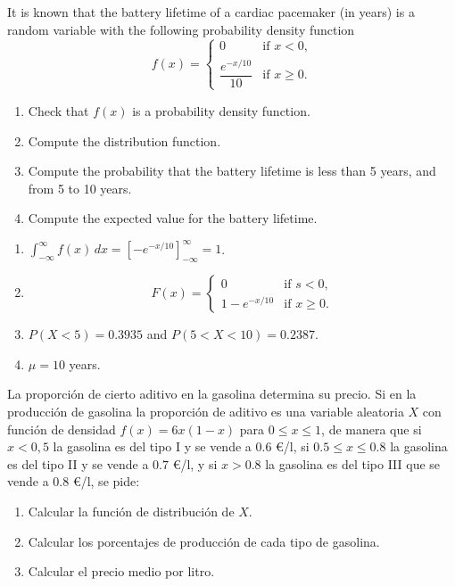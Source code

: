{It is known that the battery lifetime of a cardiac pacemaker (in years) is a random variable with the following probability density function 
\[
f(x)=
\begin{cases}
0 & \mbox{if $x<0$,}\\
\dfrac{e^{-x/10}}{10} & \mbox{if $x\geq 0$.}
\end{cases}
\]
\begin{enumerate}
\item Check that $f(x)$ is a probability density function.
\item Compute the distribution function.
\item Compute the probability that the battery lifetime is less than 5 years, and from 5 to 10 years.
\item Compute the expected value for the battery lifetime.
\end{enumerate}
}
{
\begin{enumerate}
\item $\int_{-\infty}^\infty f(x)\, dx = [-e^{-x/10}]_{-\infty}^\infty = 1$.
\item \[
F(x)=
\begin{cases}
0 & \mbox{if $s<0$,}\\
1-e^{-x/10} & \mbox{if $x\geq 0$.}
\end{cases}
\]
\item $P(X<5)=0.3935$ and $P(5<X<10)=0.2387$.
\item $\mu=10$ years.
\end{enumerate}
}
{}


{La proporción de cierto aditivo en la gasolina determina su precio. Si en la producción de gasolina la proporción de
aditivo es una variable aleatoria $X$ con función de densidad $f(x)=6x(1-x)$ para $0\leq x\leq 1$, de manera que si
$x<0,5$ la gasolina es del tipo I y se vende a $0.6$ \euro/l, si $0.5\leq x\leq 0.8$ la gasolina es del tipo II y se
vende a $0.7$ \euro/l, y si $x>0.8$ la gasolina es del tipo III que se vende a $0.8$ \euro/l, se pide:
\begin{enumerate}
\item Calcular la función de distribución de $X$.
\item Calcular los porcentajes de producción de cada tipo de gasolina.
\item Calcular el precio medio por litro.
\end{enumerate}
}
{}
{}


